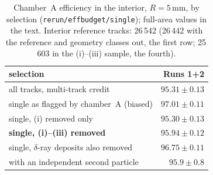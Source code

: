\begin{table}[tbp]
  \centering\small
  \caption{Chamber~A efficiency in the interior, $R=5$\,mm, by selection (\texttt{rerun/effbudget/single}); full-area values in the text. Interior reference tracks: 26\,542 (26\,442 with the reference and geometry classes out, the first row; 25\,603 in the (i)--(iii) sample, the fourth).}
  \label{tab:single}
  \begin{tabular}{lr}
    \hline
    selection & Runs 1+2 \\
    \hline
    all tracks, multi-track credit & $95.31\pm0.13$ \\
    single as flagged by chamber~A (biased) & $97.01\pm0.11$ \\
    single, (i) removed only & $95.30\pm0.13$ \\
    \textbf{single, (i)--(iii) removed} & $\mathbf{95.94\pm0.12}$ \\
    single, $\delta$-ray deposits also removed & $96.75\pm0.11$ \\
    with an independent second particle & $95.9\pm0.8$ \\
    \hline
  \end{tabular}
\end{table}

